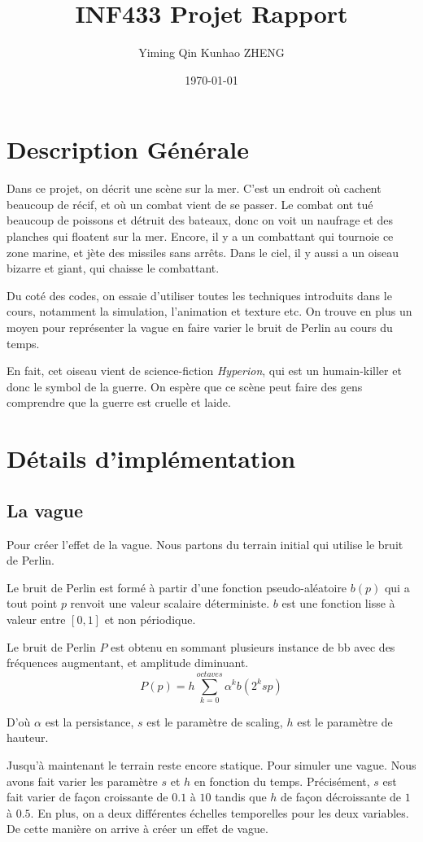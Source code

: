 \documentclass[utf8, a4paper, 12pt]{article}
\title{ INF433 Projet Rapport }
\author{Yiming Qin \qquad Kunhao ZHENG }
\date{\today}
\begin{document}
\maketitle
\section{Description Générale}
Dans ce projet, on décrit une scène sur la mer. C'est un endroit où cachent beaucoup de récif, et où un combat vient de se passer. Le combat ont tué beaucoup de poissons et détruit des bateaux, donc on voit un naufrage et des planches qui floatent sur la mer. Encore, il y a un combattant qui tournoie ce zone marine, et jète des missiles sans arrêts. Dans le ciel, il y aussi a un oiseau bizarre et giant, qui chaisse le combattant.

Du coté des codes, on essaie d'utiliser toutes les techniques introduits dans le cours, notamment la simulation, l'animation et texture etc. On trouve en plus un moyen pour représenter la vague en faire varier le bruit de Perlin au cours du temps. 

En fait, cet oiseau vient de science-fiction \textit{Hyperion}, qui est un humain-killer et donc le symbol de la guerre. On espère que ce scène peut faire des gens comprendre que la guerre est cruelle et laide.  

\section{Détails d'implémentation}

\subsection{La vague}

Pour créer l'effet de la vague. Nous partons du terrain initial qui utilise le bruit de Perlin.

Le bruit de Perlin est formé à partir d’une fonction pseudo-aléatoire $b(p)$ qui a tout point $ p $ renvoit une valeur scalaire déterministe. $ b $ est une fonction lisse à valeur entre $ [0,1] $ et non périodique.

Le bruit de Perlin $ P $ est obtenu en sommant plusieurs instance de bb avec des fréquences augmentant, et amplitude diminuant.
$$ P(p) = h \sum_{k=0}^{octaves} \alpha^k b(2^k s p) $$

D'où $\alpha$ est la persistance, $s$ est le paramètre de scaling, $h$ est le paramètre de hauteur.

Jusqu'à maintenant le terrain reste encore statique. Pour simuler une vague. Nous avons fait varier les paramètre $s$ et $h$ en fonction du temps. Précisément, $s$ est fait varier de façon croissante de $0.1$ à $10$ tandis que $h$ de façon décroissante de $1$ à $0.5$. En plus, on a deux différentes échelles temporelles pour les deux variables. De cette manière on arrive à créer un effet de vague.
\end{document}
